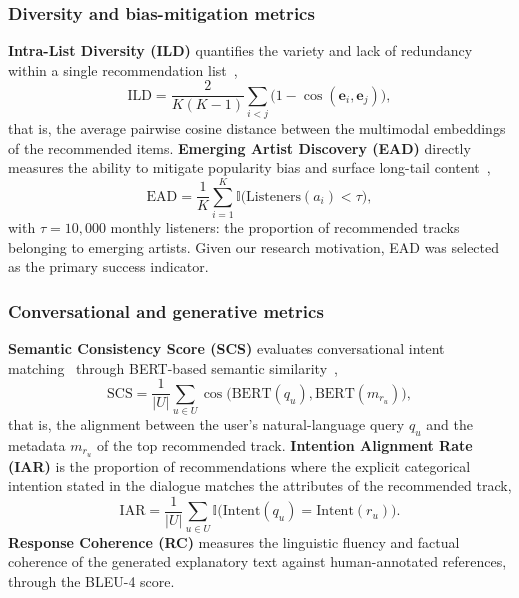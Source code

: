 \documentclass[]{ceurart}
\newcommand{\vect}[1]{\boldsymbol{#1}}
\newcommand{\cosine}{\operatorname{cos}}
\begin{document}
\subsubsection{Diversity and bias-mitigation metrics}
\textbf{Intra-List Diversity (ILD)} quantifies the variety and lack of
redundancy within a single recommendation list~\cite{ziegler2005improving},
\begin{equation}
\text{ILD} = \frac{2}{K(K-1)}\sum_{i<j} \bigl(1 -
  \cosine(\vect{e}_i, \vect{e}_j)\bigr),
\label{eq:ild}
\end{equation}
that is, the average pairwise cosine distance between the multimodal embeddings
of the recommended items. \textbf{Emerging Artist Discovery (EAD)} directly
measures the ability to mitigate popularity bias and surface long-tail
content~\cite{anderson2006longtail,park2008longtail},
\begin{equation}
\text{EAD} = \frac{1}{K} \sum_{i=1}^{K}
  \mathbb{I}\bigl(\text{Listeners}(a_i) < \tau\bigr),
\label{eq:ead}
\end{equation}
with $\tau = 10{,}000$ monthly listeners: the proportion of recommended tracks
belonging to emerging artists. Given our research motivation, EAD was selected
as the primary success indicator.

\subsubsection{Conversational and generative metrics}
\textbf{Semantic Consistency Score (SCS)} evaluates conversational intent
matching~\cite{gao2021advances} through BERT-based semantic
similarity~\cite{devlin2019bert},
\begin{equation}
\text{SCS} = \frac{1}{|U|}\sum_{u \in U}
  \cosine\bigl(\text{BERT}(q_u), \text{BERT}(m_{r_u})\bigr),
\label{eq:scs}
\end{equation}
that is, the alignment between the user's natural-language query $q_u$ and the
metadata $m_{r_u}$ of the top recommended track. \textbf{Intention Alignment
Rate (IAR)} is the proportion of recommendations where the explicit categorical
intention stated in the dialogue matches the attributes of the recommended
track,
\begin{equation}
\text{IAR} = \frac{1}{|U|} \sum_{u \in U}
  \mathbb{I}\bigl(\text{Intent}(q_u) = \text{Intent}(r_u)\bigr).
\label{eq:iar}
\end{equation}
\textbf{Response Coherence (RC)} measures the linguistic fluency and factual
coherence of the generated explanatory text against human-annotated references,
through the BLEU-4 score.
\end{document}
